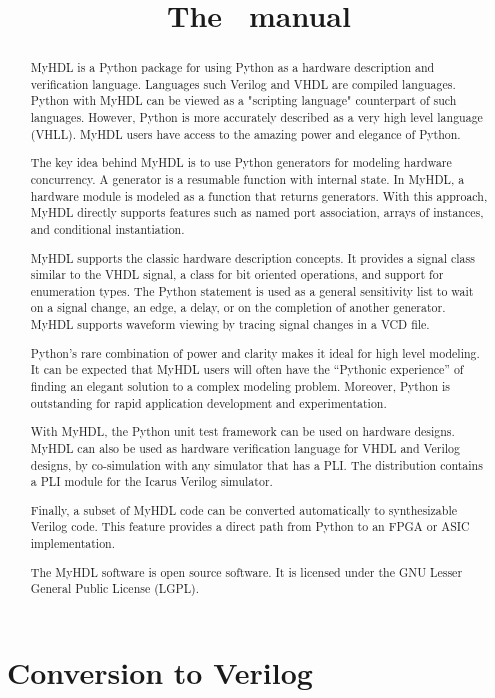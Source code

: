 \documentclass{manual}
\title{The \myhdl\ manual}
\newcommand{\myhdl}{\protect \mbox{MyHDL}}
\begin{document}
\maketitle



\begin{abstract}

\noindent

\myhdl{} is a Python package for using Python as a hardware description
and verification language. Languages such Verilog and VHDL are
compiled languages. Python with \myhdl{} can be viewed as a "scripting
language" counterpart of such languages. However, Python is more
accurately described as a very high level language (VHLL). \myhdl{} users
have access to the amazing power and elegance of Python.

The key idea behind \myhdl{} is to use Python generators for modeling
hardware concurrency. A generator is a resumable function with
internal state. In \myhdl{}, a hardware module is modeled as a function
that returns generators. With this approach, \myhdl{} directly supports
features such as named port association, arrays of instances, and
conditional instantiation. 

\myhdl{} supports the classic hardware description concepts.  It
provides a signal class similar to the VHDL signal, a class for bit
oriented operations, and support for enumeration types.  The Python
 statement is used as a general sensitivity list to wait
on a signal change, an edge, a delay, or on the completion of another
generator. \myhdl{} supports waveform viewing by tracing signal
changes in a VCD file.

Python's rare combination of power and clarity makes it ideal for high
level modeling.  It can be expected that \myhdl{} users will often
have the ``Pythonic experience'' of finding an elegant solution to a
complex modeling problem. Moreover, Python is outstanding for rapid
application development and experimentation.

With \myhdl{}, the Python unit test framework can be used on hardware
designs.  \myhdl{} can also be used as hardware verification language for
VHDL and Verilog designs, by co-simulation with any simulator that has
a PLI.  The distribution contains a PLI module for the
Icarus Verilog simulator.

Finally, a subset of \myhdl{} code can be converted automatically to
synthesizable Verilog code. This feature provides a direct path from
Python to an FPGA or ASIC implementation.

The \myhdl{} software is open source software. It is licensed under the
GNU Lesser General Public License (LGPL).




\end{abstract}

\tableofcontents







\chapter{Conversion to Verilog\label{conv}}





\end{document}
